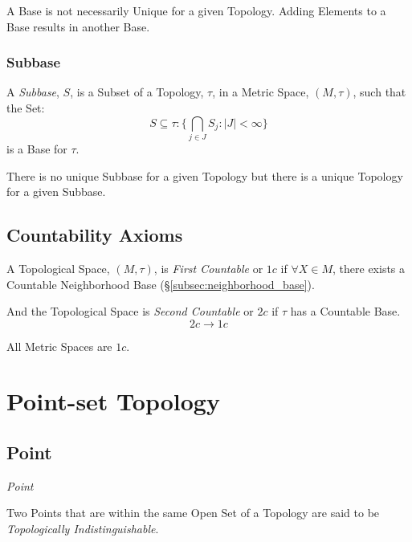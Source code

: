 \documentclass{article}
\begin{document}
A Base is not necessarily Unique for a given Topology. Adding Elements
to a Base results in another Base.



\subsubsection{Subbase}

A \emph{Subbase}, $S$, is a Subset of a Topology, $\tau$, in a Metric
Space, $(M,\tau)$, such that the Set:
\[
    S \subseteq \tau : \{ \bigcap_{j \in J} S_j : |J| < \infty \}
\]
is a Base for $\tau$.

There is no unique Subbase for a given Topology but there is a unique
Topology for a given Subbase.



\subsection{Countability Axioms}\label{subsec:countability_axioms}

A Topological Space, $(M,\tau)$, is \emph{First Countable} or $1c$ if
$\forall X \in M$, there exists a Countable Neighborhood Base
(\S\ref{subsec:neighborhood_base}).

And the Topological Space is \emph{Second Countable} or $2c$ if $\tau$
has a Countable Base.
\[
    2c \rightarrow 1c
\]

All Metric Spaces are $1c$.



\section{Point-set Topology}\label{sec:point_set}

\subsection{Point}\label{subsec:topological_point}

\emph{Point}

Two Points that are within the same Open Set of a Topology are said to
be \emph{Topologically Indistinguishable}.
\end{document}
